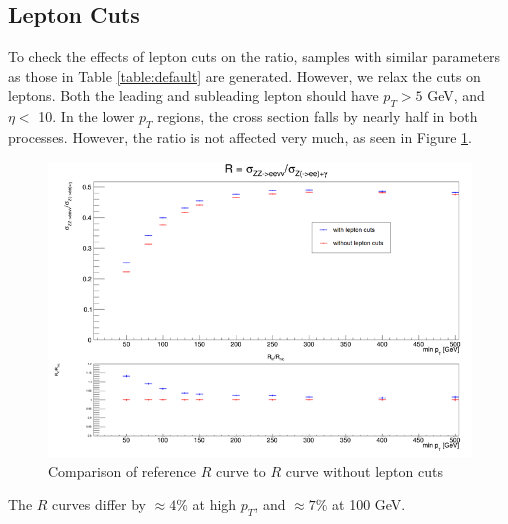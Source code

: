 \documentclass[11pt,a4paper,final]{report}
\begin{document}
\subsection{Lepton Cuts}
To check the effects of lepton cuts on the ratio, samples with similar parameters as those in Table \ref{table:default} are generated. However, we relax the cuts on leptons. Both the leading and subleading lepton should have $p_T > 5$ GeV, and $\eta <$ 10. In the lower $p_T$ regions, the cross section falls by nearly half in both processes. However, the ratio is not affected very much, as seen in Figure \ref{fig:lepcut}.
\begin{figure}[H]
\centering
	\includegraphics[width = 0.7\linewidth]{lep_cuts.png}
	\caption{Comparison of reference $R$ curve to $R$ curve without lepton cuts}
	\label{fig:lepcut}
\end{figure}
The $R$ curves differ by $\approx 4\%$ at high $p_T$, and $\approx 7\%$ at 100 GeV.
\end{document}
